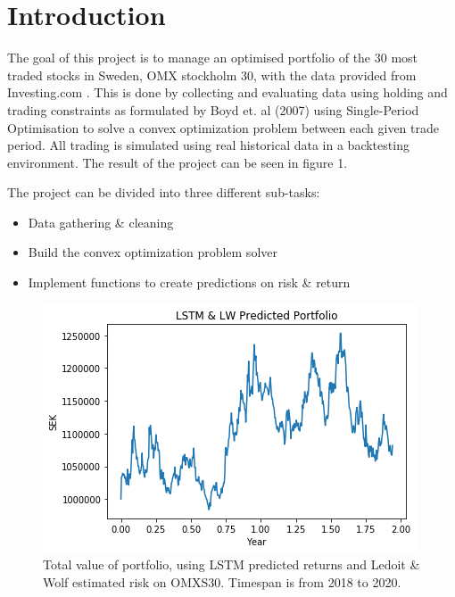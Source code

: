 \documentclass[final]{LTHtwocol} %
\begin{document}
\section{Introduction}
The goal of this project is to manage an optimised portfolio of the 30 most traded stocks in Sweden, OMX stockholm 30, with the data provided from Investing.com \cite{ref:Investing}. This is done by collecting and evaluating data using holding and trading constraints as formulated by Boyd et. al (2007) using Single-Period Optimisation to solve a convex optimization problem between each given trade period\cite{Boyd}. All trading is simulated using real historical data in a backtesting environment. The result of the project can be seen in figure 1.

The project can be divided into three different sub-tasks:
\begin{itemize}
\item Data gathering \& cleaning
\item Build the convex optimization problem solver
\item Implement functions to create predictions on risk \& return
\end{itemize}

 

\begin{figure}[h]
	\centering
	\includegraphics[width=0.8\columnwidth]{Pics/result/LSTM_LW.png}
	\caption{Total value of portfolio, using LSTM predicted returns and Ledoit \& Wolf estimated risk on OMXS30. Timespan is from 2018 to 2020.}
	\label{fig:LSTMLW} 
\end{figure}

\end{document}
